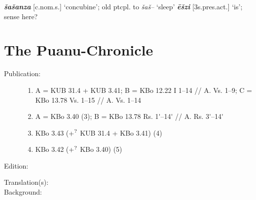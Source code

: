 \documentclass[10pt]{article}
\newcommand{\supersc}[1]{$^{\textrm{\scriptsize{#1}}}$}  	%
\newcommand{\bit}[1]{\textbf{\textit{#1}}}				%
\newcommand{\p}[1]{{\tiny[{#1}]}}					%
\newcommand{\pr}{\'{ }}									%
\newcommand{\hith}{\textsubwedge{h}}
\renewcommand{\.}[1]{\textsubdot{#1}}
\begin{document}
\begin{description}
\begin{notes}

\bit{\v{s}a\v{s}anza} \p{c.nom.s.} `concubine'; old ptcpl. to \textit{\v{s}a\v{s}--} `sleep' \bit{\=e\v{s}zi} \p{3s.pres.act.} `is'; sense here?


\end{notes}

\end{description}

\section{The Pu{\hith}anu-Chronicle}

\begin{description}

\item[Publication:] \begin{enumerate}

\item A = KUB 31.4 + KUB 3.41; B = KBo 12.22 I 1--14 // A. Vs. 1--9; C = KBo 13.78 Vs. 1--15 // A. Vs. 1--14
\item A = KBo 3.40 (3); B = KBo 13.78 Rs. 1{\pr}--14{\pr} // A. Rs. 3{\pr}--14{\pr}
\item KBo 3.43 (+\supersc{?} KUB 31.4 + KBo 3.41) (4)
\item KBo 3.42 (+\supersc{?} KBo 3.40) (5)

\end{enumerate}

\item[Edition:] \citet{soysal1981puhanu}
\item[Translation(s):] 
\item[Background:] 

\end{description}

\subsection{}
\end{document}
